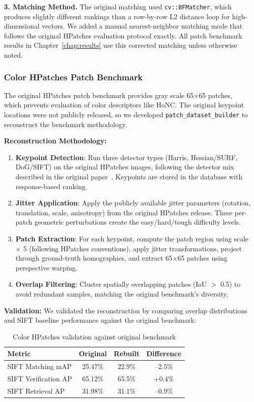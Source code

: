 \textbf{3. Matching Method.} The original matching used \texttt{cv::BFMatcher}, which produces slightly different rankings than a row-by-row L2 distance loop for high-dimensional vectors. We added a manual nearest-neighbor matching mode that follows the original HPatches evaluation protocol exactly. All patch benchmark results in Chapter~\ref{chap:results} use this corrected matching unless otherwise noted.

\subsubsection{Color HPatches Patch Benchmark}

The original HPatches patch benchmark provides gray scale 65$\times$65 patches, which prevents evaluation of color descriptors like HoNC. The original keypoint locations were not publicly released, so we developed \texttt{patch\_dataset\_builder} to reconstruct the benchmark methodology.

\textbf{Reconstruction Methodology:}
\begin{enumerate}
    \item \textbf{Keypoint Detection}: Run three detector types (Harris, Hessian/SURF, DoG/SIFT) on the original HPatches images, following the detector mix described in the original paper~\cite{balntas2017hpatches}. Keypoints are stored in the database with response-based ranking.
    \item \textbf{Jitter Application}: Apply the publicly available jitter parameters (rotation, translation, scale, anisotropy) from the original HPatches release. These per-patch geometric perturbations create the easy/hard/tough difficulty levels.
    \item \textbf{Patch Extraction}: For each keypoint, compute the patch region using scale $\times$ 5 (following HPatches conventions), apply jitter transformations, project through ground-truth homographies, and extract 65$\times$65 patches using perspective warping.
    \item \textbf{Overlap Filtering}: Cluster spatially overlapping patches (IoU $>$ 0.5) to avoid redundant samples, matching the original benchmark's diversity.
\end{enumerate}

\textbf{Validation:}
We validated the reconstruction by comparing overlap distributions and SIFT baseline performance against the original benchmark:

\begin{table}[ht]
\centering
\caption{Color HPatches validation against original benchmark}
\label{tab:hpatches_validation}
\begin{tabular}{lccc}
\toprule
\textbf{Metric} & \textbf{Original} & \textbf{Rebuilt} & \textbf{Difference} \\
\midrule
SIFT Matching mAP & 25.47\% & 22.9\% & --2.5\% \\
SIFT Verification AP & 65.12\% & 65.5\% & +0.4\% \\
SIFT Retrieval AP & 31.98\% & 31.1\% & --0.9\% \\
\bottomrule
\end{tabular}
\end{table}

